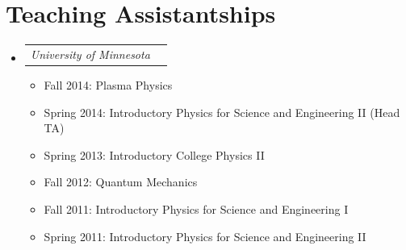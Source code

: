 \documentclass[12pt,letterpaper]{article}
\makeatletter
\newcommand{\headerpair}[2]{
    \begin{tabular*}{\linewidth}{l@{ \extracolsep{\fill} }r} {\large\emph{#1}} & {\large\emph{#2}}
    \end{tabular*}
}
\newcommand{\ResumeSection}[1]{\section*{{\color{MidnightBlue}#1 \sout{\hfill}}}}
\makeatother
\begin{document}

\ResumeSection{Teaching Assistantships}

\begin{itemize}[leftmargin=\parindent]
    \parskip=0.1em
    \itemsep=1.2em

    \item[]
        \headerpair{University of Minnesota}{}
        \begin{itemize}[leftmargin=\parindent]
            \item Fall 2014: Plasma Physics
            \item Spring 2014: Introductory Physics for Science and Engineering II (Head TA)
            \item Spring 2013: Introductory College Physics II
            \item Fall 2012: Quantum Mechanics
            \item Fall 2011: Introductory Physics for Science and Engineering I
            \item Spring 2011: Introductory Physics for Science and Engineering II
        \end{itemize}


\end{itemize}
\end{document}
